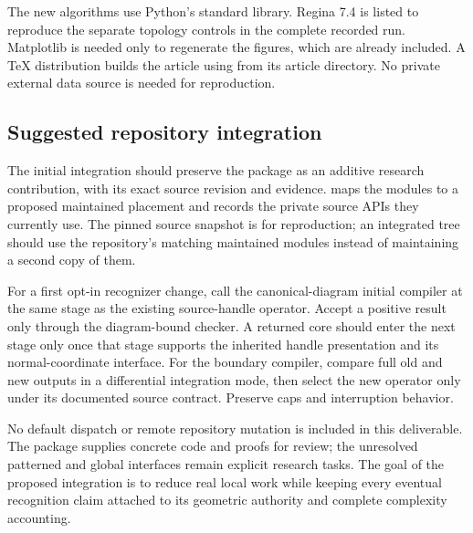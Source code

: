 The new algorithms use Python's standard library.  Regina 7.4 is listed
to reproduce the separate topology controls in the complete recorded run.
Matplotlib is needed only to regenerate the figures, which are already
included.  A TeX distribution builds the article using
 from its article directory.
No private external data source is needed for reproduction.

\subsection{Suggested repository integration}

The initial integration should preserve the package as an additive
research contribution, with its exact source revision and evidence.
 maps the modules to a proposed maintained
placement and records the private source APIs they currently use.
The pinned source snapshot is for reproduction; an integrated tree should
use the repository's matching maintained modules instead of maintaining a
second copy of them.

For a first opt-in recognizer change, call the canonical-diagram initial
compiler at the same stage as the existing source-handle operator.
Accept a positive result only through the diagram-bound checker.  A
returned core should enter the next stage only once that stage supports
the inherited handle presentation and its normal-coordinate interface.
For the boundary compiler, compare full old and new outputs in a
differential integration mode, then select the new operator only under
its documented source contract.  Preserve caps and interruption behavior.

No default dispatch or remote repository mutation is included in this
deliverable.  The package supplies concrete code and proofs for review;
the unresolved patterned and global interfaces remain explicit research
tasks.  The goal of the proposed integration is to reduce real local work
while keeping every eventual recognition claim attached to its geometric
authority and complete complexity accounting.
